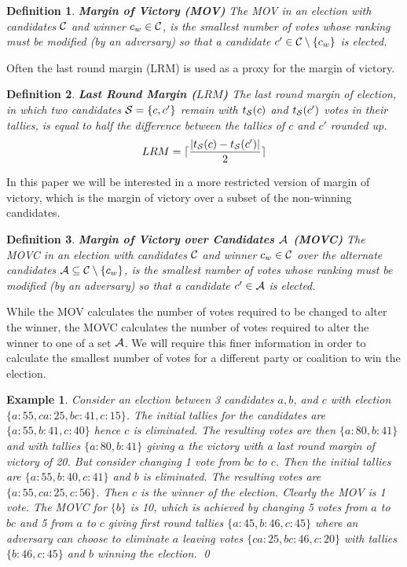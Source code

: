 \documentclass{article}
\newcommand{\tally}{t}
\newtheorem{theorem}{Example}
\newenvironment{example}{\begin{theorem}}{\end{theorem}}
\newtheorem{mydef}{Definition}
\newenvironment{definition}{\begin{mydef}\rm}{\end{mydef}}
\begin{document}
\begin{definition}{\textbf{Margin of Victory (MOV)}} The MOV in an election with candidates $\mathcal{C}$ and winner $c_w \in \mathcal{C}$, is the \textit{smallest} number of votes whose ranking must be modified (by an adversary) so that a candidate $c' \in \mathcal{C} \setminus \{c_w\}$ is elected.  
\label{def:MOV}
\end{definition}

Often the last round margin (LRM) is used as a proxy for the margin of victory.

\begin{definition}{\textbf{Last Round Margin ($LRM$)}} The last round
margin of election, in which two candidates $\mathcal{S} = \{c, c'\}$
remain with $\tally_{\stand}(c)$ and $\tally_{\stand}(c')$ votes in their
tallies, is equal to half the difference between the tallies of $c$ and $c'$ rounded up.
\begin{equation}
LRM = \lceil \frac{|\tally_{\stand}(c) - \tally_{\stand}(c')|}{2} \rceil
\end{equation}
\label{def:LRM}
\end{definition}


In this paper we will be interested in a more restricted version of margin of victory, which is the margin of victory over a subset of the non-winning candidates.

\begin{definition}{\textbf{Margin of Victory over Candidates $\mathcal{A}$ (MOVC)}} The MOVC in an election with candidates $\mathcal{C}$ and winner $c_w \in \mathcal{C}$ over the alternate candidates $\mathcal{A} \subseteq \mathcal{C} \setminus \{c_w\}$, is the \textit{smallest} number of votes whose ranking must be modified (by an adversary) so that a candidate $c' \in \mathcal{A}$ is elected.  
\label{def:MOVC}
\end{definition}

While the MOV calculates the number of votes required to be changed to alter the winner, the MOVC calculates the number of votes required to alter the winner to one of a set $\mathcal{A}$. We will require this finer information 
in order to calculate the smallest number of votes for a different party or coalition to win the election.


\begin{example}
Consider an election between 3 candidates $a, b$, and $c$ with election $\{a:55, ca:25, bc:41, c:15\}$. The initial tallies for the candidates are $\{a:55,b:41,c:40\}$ hence $c$ is eliminated. The resulting votes are then
$\{a:80, b:41 \}$ and with tallies $\{a:80, b:41\}$
giving $a$ the victory with a last round margin of victory of 20.  
But consider changing 1 vote from $bc$ to $c$. Then the initial tallies are $\{a:55,b:40,c:41\}$
and $b$ is eliminated. The resulting votes are
$\{a:55, ca:25, c:56\}$. Then $c$ is the winner of the election. Clearly the MOV is 1 vote. 
The MOVC for $\{b\}$ is 10, which is achieved by changing 5 votes from $a$ to $bc$ and 5 from $a$ to $c$ giving first round tallies $\{ a:45,b:46,c:45\}$
where an adversary can choose to eliminate $a$ leaving votes
$\{ ca:25, bc:46, c:20\}$ with tallies $\{b:46,c:45\}$
and $b$ winning the election. \qed
\end{example}
\end{document}
